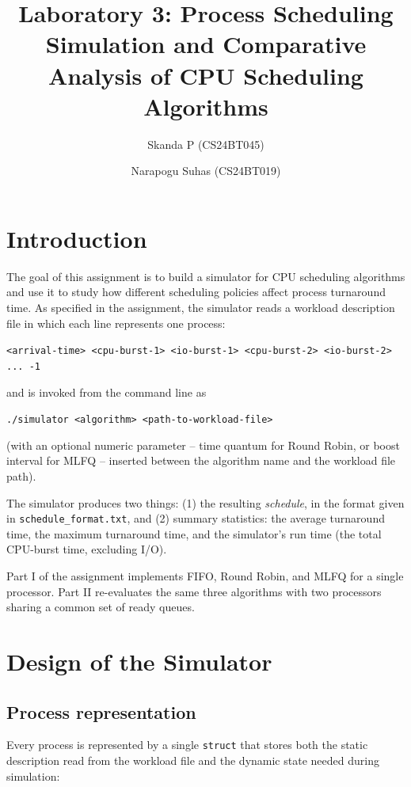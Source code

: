 \documentclass[11pt]{article}
\title{\textbf{Laboratory 3: Process Scheduling}\\[4pt]
\large Simulation and Comparative Analysis of CPU Scheduling Algorithms}
\author{Skanda P \; (CS24BT045) \and Narapogu Suhas \; (CS24BT019)}
\date{}
\begin{document}
\maketitle
\thispagestyle{fancy}

\section{Introduction}
The goal of this assignment is to build a simulator for CPU scheduling
algorithms and use it to study how different scheduling policies affect
process turnaround time. As specified in the assignment, the simulator reads
a workload description file in which each line represents one process:

\begin{center}
\texttt{<arrival-time> <cpu-burst-1> <io-burst-1> <cpu-burst-2> <io-burst-2> ... -1}
\end{center}

and is invoked from the command line as

\begin{center}
\texttt{./simulator <algorithm> <path-to-workload-file>}
\end{center}

(with an optional numeric parameter -- time quantum for Round Robin, or
boost interval for MLFQ -- inserted between the algorithm name and the
workload file path).

The simulator produces two things: (1) the resulting \emph{schedule}, in the
format given in \texttt{schedule\_format.txt}, and (2) summary statistics:
the average turnaround time, the maximum turnaround time, and the
simulator's run time (the total CPU-burst time, excluding I/O).

Part I of the assignment implements FIFO, Round Robin, and MLFQ for a
single processor. Part II re-evaluates the same three algorithms with two
processors sharing a common set of ready queues.

\section{Design of the Simulator}

\subsection{Process representation}
Every process is represented by a single \texttt{struct} that stores both the
static description read from the workload file and the dynamic state needed
during simulation:
\end{document}

